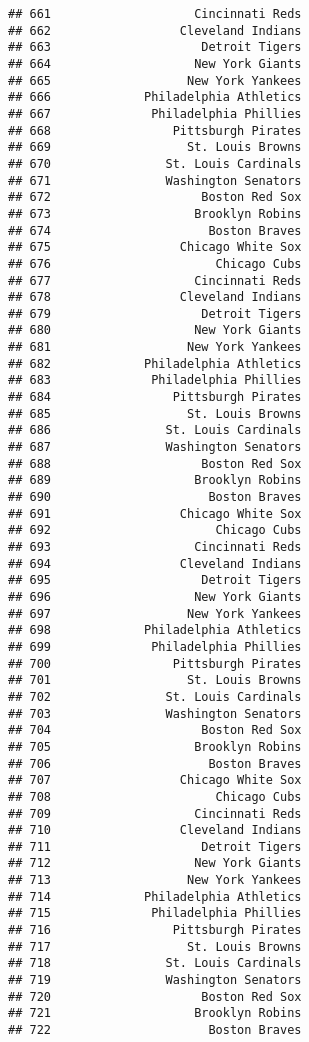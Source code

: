 \documentclass[]{article}
\begin{document}
\begin{verbatim}
## 661                    Cincinnati Reds
## 662                  Cleveland Indians
## 663                     Detroit Tigers
## 664                    New York Giants
## 665                   New York Yankees
## 666             Philadelphia Athletics
## 667              Philadelphia Phillies
## 668                 Pittsburgh Pirates
## 669                   St. Louis Browns
## 670                St. Louis Cardinals
## 671                Washington Senators
## 672                     Boston Red Sox
## 673                    Brooklyn Robins
## 674                      Boston Braves
## 675                  Chicago White Sox
## 676                       Chicago Cubs
## 677                    Cincinnati Reds
## 678                  Cleveland Indians
## 679                     Detroit Tigers
## 680                    New York Giants
## 681                   New York Yankees
## 682             Philadelphia Athletics
## 683              Philadelphia Phillies
## 684                 Pittsburgh Pirates
## 685                   St. Louis Browns
## 686                St. Louis Cardinals
## 687                Washington Senators
## 688                     Boston Red Sox
## 689                    Brooklyn Robins
## 690                      Boston Braves
## 691                  Chicago White Sox
## 692                       Chicago Cubs
## 693                    Cincinnati Reds
## 694                  Cleveland Indians
## 695                     Detroit Tigers
## 696                    New York Giants
## 697                   New York Yankees
## 698             Philadelphia Athletics
## 699              Philadelphia Phillies
## 700                 Pittsburgh Pirates
## 701                   St. Louis Browns
## 702                St. Louis Cardinals
## 703                Washington Senators
## 704                     Boston Red Sox
## 705                    Brooklyn Robins
## 706                      Boston Braves
## 707                  Chicago White Sox
## 708                       Chicago Cubs
## 709                    Cincinnati Reds
## 710                  Cleveland Indians
## 711                     Detroit Tigers
## 712                    New York Giants
## 713                   New York Yankees
## 714             Philadelphia Athletics
## 715              Philadelphia Phillies
## 716                 Pittsburgh Pirates
## 717                   St. Louis Browns
## 718                St. Louis Cardinals
## 719                Washington Senators
## 720                     Boston Red Sox
## 721                    Brooklyn Robins
## 722                      Boston Braves

\end{verbatim}
\end{document}
